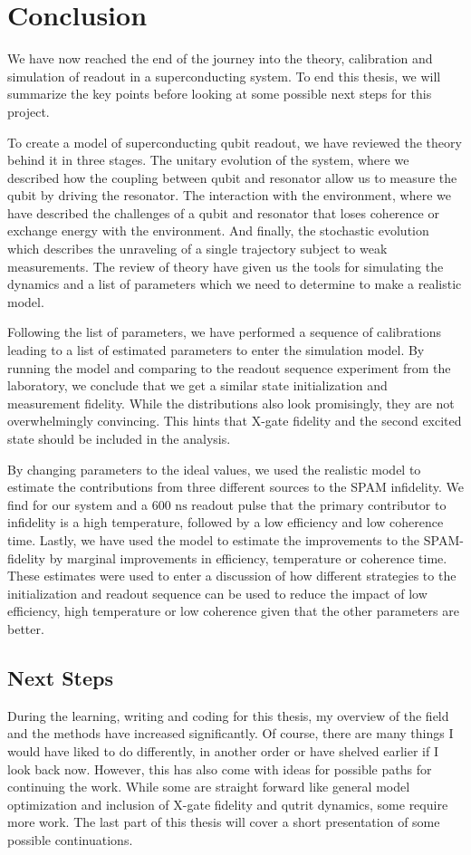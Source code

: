 \chapter{Conclusion}\label{chap:conclusion}
We have now reached the end of the journey into the theory, calibration and simulation of readout in a superconducting system.  To end this thesis, we will summarize the key points before looking at some possible next steps for this project.

To create a model of superconducting qubit readout, we have reviewed the theory behind it in three stages. The unitary evolution of the system, where we described how the coupling between qubit and resonator allow us to measure the qubit by driving the resonator. The interaction with the environment, where we have described the challenges of a qubit and resonator that loses coherence or exchange energy with the environment. And finally, the stochastic evolution which describes the unraveling of a single trajectory subject to weak measurements. The review of theory have given us the tools for simulating the dynamics and a list of parameters which we need to determine to make a realistic model.

Following the list of parameters, we have performed a sequence of calibrations leading to a list of estimated parameters to enter the simulation model. By running the model and comparing to the readout sequence experiment from the laboratory, we conclude that we get a similar state initialization and measurement fidelity. While the distributions also look promisingly, they are not overwhelmingly convincing. This hints that X-gate fidelity and the second excited state should be included in the analysis. 

By changing parameters to the ideal values, we used the realistic model to estimate the contributions from three different sources to the SPAM infidelity. We find for our system and a $600 \text{ ns}$ readout pulse that the primary contributor to infidelity is a high temperature, followed by a low efficiency and low coherence time. Lastly, we have used the model to estimate the improvements to the SPAM-fidelity by marginal improvements in efficiency, temperature or coherence time. These estimates were used to enter a discussion of how different strategies to the initialization and readout sequence can be used to reduce the impact of low efficiency, high temperature or low coherence given that the other parameters are better. 


\section{Next Steps}
During the learning, writing and coding  for this thesis, my overview of the field and the methods have increased significantly. Of course,  there are many things I would have liked to do differently, in another order or have shelved earlier if I look back now. However, this has also come with ideas for possible paths for continuing the work. While some are straight forward like general model optimization and inclusion of X-gate fidelity and qutrit dynamics, some require more work. The last part of this thesis will cover a short presentation of some possible continuations.

